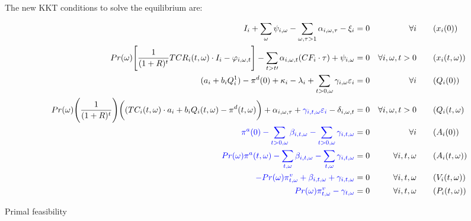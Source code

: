 \documentclass[11pt, letterpaper]{article}
\newcommand{\pia}{\textcolor[rgb]{0,0,1}}
\begin{document}
The new KKT conditions to solve the equilibrium are:

\begin{align}
    I_i + \sum_{\omega}\psi_{i,\omega} -\sum_{\omega,\tau>1} \alpha_{i,\omega,\tau} -\xi_i & = 0 & \forall i {\color{blue}}&  \qquad (x_i(0))\\
    Pr(\omega) \Bigg[\frac{1}{(1+R)^t}TCR_i(t,\omega) \cdot I_i -  \varphi_{i,\omega,t}\Bigg] - \sum_{t> t\prime}\alpha_{i,\omega,t} ( CF_i \cdot \tau)  + \psi_{i,\omega}& = 0 & \forall i, \omega, t> 0  &  \qquad (x_i(t,\omega))\\
    (a_{i}+b_iQ^{1}_{i})-\pi^d(0) + \kappa_i - \lambda_{i} + \sum_{t>0,\omega} \gamma_{i,\omega}\varepsilon_i & = 0 & \forall i  &  \qquad (Q_i(0))\\
 Pr(\omega) \Bigg( \frac{1}{(1+R)^t}\Bigg) \bigg( (TC_i(t,\omega) \cdot a_{i}+b_i Q_i(t,\omega)-\pi^d(t,\omega) \bigg) + \alpha_{i,\omega,\tau} + \pia{\gamma_{i,t,\omega} \varepsilon_{i}} -\delta_{i,\omega,t} & =0 & \forall i, \omega, t>0 &  \qquad (Q_i(t,\omega)\\
   \pia{ \pi^{a}(0) - \sum_{t>0,\omega}\beta_{i,t,\omega} - \sum_{t>0,\omega}\gamma_{i,t,\omega}} & =0 & \forall i & \qquad (A_{i}(0)) \\
  \pia{  Pr(\omega)\pi^a(t,\omega) - \sum_{t,\omega}\beta_{i,t,\omega} - \sum_{t,\omega}\gamma_{i,t,\omega} } & =0 & \forall i,t,\omega & \qquad (A_{i}(t,\omega)) \\
  \pia{  -Pr(\omega) \pi^v_{t,\omega} + \beta_{i,t,\omega}  + \gamma_{i,t,\omega}} & =0 & \forall i,t,\omega & \qquad (V_i(t,\omega)) \\
\pia{    Pr(\omega) \pi^v_{t,\omega} -\gamma_{t,\omega}} & = 0 & \forall i, t,\omega & \qquad (P_i(t,\omega))
\end{align}

\begin{flushleft}
Primal feasibility
\end{flushleft}
\end{document}
